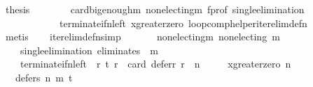 \begin{isabellebody}
\ {\isacharquery}{\kern0pt}thesis\isanewline
\ \ \ \ \ \ \isamarkupfalse%
\ card{\isacharunderscore}{\kern0pt}big{\isacharunderscore}{\kern0pt}enough{\isacharunderscore}{\kern0pt}m\ non{\isacharunderscore}{\kern0pt}electing{\isacharunderscore}{\kern0pt}m\ f{\isacharunderscore}{\kern0pt}prof\ single{\isacharunderscore}{\kern0pt}elimination\isanewline
\ \ \ \ \ \ \ \ \ \ \ \ terminate{\isacharunderscore}{\kern0pt}if{\isacharunderscore}{\kern0pt}n{\isacharunderscore}{\kern0pt}left\ x{\isacharunderscore}{\kern0pt}greater{\isacharunderscore}{\kern0pt}zero\ loop{\isacharunderscore}{\kern0pt}comp{\isacharunderscore}{\kern0pt}helper{\isacharunderscore}{\kern0pt}iter{\isacharunderscore}{\kern0pt}elim{\isacharunderscore}{\kern0pt}def{\isacharunderscore}{\kern0pt}n\isanewline
\ \ \ \ \ \ \isamarkupfalse%
\ metis\isanewline
\ \ \isamarkupfalse%
\isanewline
{}\isamarkupfalse%
%
\endisatagproof
{\isafoldproof}%
%
\isadelimproof
\isanewline
%
\endisadelimproof
\isanewline
{}\isamarkupfalse%
\ iter{\isacharunderscore}{\kern0pt}elim{\isacharunderscore}{\kern0pt}def{\isacharunderscore}{\kern0pt}n{\isacharbrackleft}{\kern0pt}simp{\isacharbrackright}{\kern0pt}{\isacharcolon}{\kern0pt}\isanewline
\ \ \isanewline
\ \ \ \ non{\isacharunderscore}{\kern0pt}electing{\isacharunderscore}{\kern0pt}m{\isacharcolon}{\kern0pt}\ {\isachardoublequoteopen}non{\isacharunderscore}{\kern0pt}electing\ m{\isachardoublequoteclose}\ \isanewline
\ \ \ \ single{\isacharunderscore}{\kern0pt}elimination{\isacharcolon}{\kern0pt}\ {\isachardoublequoteopen}eliminates\ {}\ m{\isachardoublequoteclose}\ \isanewline
\ \ \ \ terminate{\isacharunderscore}{\kern0pt}if{\isacharunderscore}{\kern0pt}n{\isacharunderscore}{\kern0pt}left{\isacharcolon}{\kern0pt}\ {\isachardoublequoteopen}{\isasymforall}\ r{\isachardot}{\kern0pt}\ {\isacharparenleft}{\kern0pt}{\isacharparenleft}{\kern0pt}t\ r{\isacharparenright}{\kern0pt}\ {\isasymlongleftrightarrow}\ {\isacharparenleft}{\kern0pt}card\ {\isacharparenleft}{\kern0pt}defer{\isacharunderscore}{\kern0pt}r\ r{\isacharparenright}{\kern0pt}\ {\isacharequal}{\kern0pt}\ n{\isacharparenright}{\kern0pt}{\isacharparenright}{\kern0pt}{\isachardoublequoteclose}\ \isanewline
\ \ \ \ x{\isacharunderscore}{\kern0pt}greater{\isacharunderscore}{\kern0pt}zero{\isacharcolon}{\kern0pt}\ {\isachardoublequoteopen}n\ {\isachargreater}{\kern0pt}\ {}{\isachardoublequoteclose}\isanewline
\ \ \ {\isachardoublequoteopen}defers\ n\ {\isacharparenleft}{\kern0pt}m\ {\isasymcirclearrowleft}\isactrlsub t{\isacharparenright}{\kern0pt}{\isachardoublequoteclose}\isanewline

\end{isabellebody}
